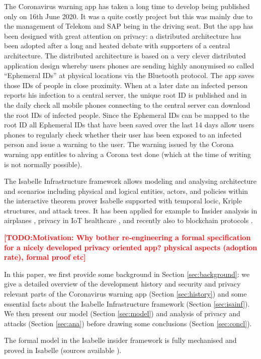 \documentclass{llncs}
\newcommand{\TODO}[1]{\textcolor{red}{\textbf{[TODO:#1]}}}
\begin{document}
The Coronavirus warning app has taken a long time to develop being published only on
16th June 2020. It was a quite costly project but this was mainly due to the management of
Telekom and SAP being in the driving seat. But the app has been designed with great
attention on privacy:  a distributed architecture \cite{} has been adopted after a long and
heated debate with supporters of a central architecture. The distributed architecture is
based on a very clever distributed application design whereby users phones are sending
highly anonymised so called ``Ephemeral IDs'' at physical locations via the Bluetooth
protocol. The app saves those IDs of people in close proximity. When at a later date an
infected person reports his infection to a central server, the unique root ID is published
and in the daily check all mobile phones connecting to the central server can download
the root IDs of infected people. Since the Ephemeral IDs can be mapped to the root ID
all Ephemeral IDs that have been saved over the last 14 days allow users phones to
regularly check whether their user has been exposed to an infected person and issue
a warning to the user. The warning issued by the Corona warning app entitles to
ahving a Corona test done (which at the time of writing is not normally possible).

The Isabelle Infrastructure framework \cite{kam:20a} allows modeling and analysing
architecture and scenarios including physical and logical entities, actors, and policies
within the interactive theorem prover Isabelle supported with temporal locic, Kriple
structures, and attack trees. It has been applied for example to Insider analysis in
airplanes \cite{kam:20b}, privacy in IoT healthcare \cite{kam:18b}, and recently also
to blockchain protocols \cite{kn:20}.


\TODO{Motivation: Why bother re-engineering a formal specification for a nicely developed privacy oriented app? physical aspects (adoption rate), formal proof etc}

In this paper, we first provide some background in Section \ref{sec:background}:
we give a detailed overview of the development history and security and privacy
relevant parts of the Coronavirus warning app (Section \ref{sec:history})
and some essential facts about the Isabelle Infrastructure framework
(Section \ref{sec:isainf}).
We then present our model (Section \ref{sec:model}) and analysis of privacy and
attacks (Section \ref{sec:ana}) before drawing some conclusions (Section \ref{sec:concl}).

The formal model in the Isabelle insider framework is fully mechanised and proved in
Isabelle (sources available \cite{kam:18smc}). 
\end{document}
